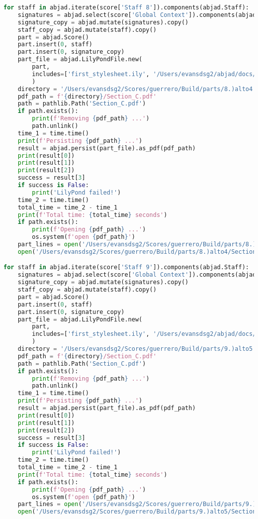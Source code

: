 \begin{lstlisting}[language=Python, caption=Invocation Source Code]
for staff in abjad.iterate(score['Staff 8']).components(abjad.Staff):
    signatures = abjad.select(score['Global Context']).components(abjad.Staff)
    signature_copy = abjad.mutate(signatures).copy()
    staff_copy = abjad.mutate(staff).copy()
    part = abjad.Score()
    part.insert(0, staff)
    part.insert(0, signature_copy)
    part_file = abjad.LilyPondFile.new(
        part,
        includes=['first_stylesheet.ily', '/Users/evansdsg2/abjad/docs/source/_stylesheets/abjad.ily'],
        )
    directory = '/Users/evansdsg2/Scores/guerrero/Build/parts/8.)alto4'
    pdf_path = f'{directory}/Section_C.pdf'
    path = pathlib.Path('Section_C.pdf')
    if path.exists():
        print(f'Removing {pdf_path} ...')
        path.unlink()
    time_1 = time.time()
    print(f'Persisting {pdf_path} ...')
    result = abjad.persist(part_file).as_pdf(pdf_path)
    print(result[0])
    print(result[1])
    print(result[2])
    success = result[3]
    if success is False:
        print('LilyPond failed!')
    time_2 = time.time()
    total_time = time_2 - time_1
    print(f'Total time: {total_time} seconds')
    if path.exists():
        print(f'Opening {pdf_path} ...')
        os.system(f'open {pdf_path}')
    part_lines = open('/Users/evansdsg2/Scores/guerrero/Build/parts/8.)alto4/Section_C.ly').readlines()
    open('/Users/evansdsg2/Scores/guerrero/Build/parts/8.)alto4/Section_C.ly', 'w').writelines(part_lines[15:-1])

for staff in abjad.iterate(score['Staff 9']).components(abjad.Staff):
    signatures = abjad.select(score['Global Context']).components(abjad.Staff)
    signature_copy = abjad.mutate(signatures).copy()
    staff_copy = abjad.mutate(staff).copy()
    part = abjad.Score()
    part.insert(0, staff)
    part.insert(0, signature_copy)
    part_file = abjad.LilyPondFile.new(
        part,
        includes=['first_stylesheet.ily', '/Users/evansdsg2/abjad/docs/source/_stylesheets/abjad.ily'],
        )
    directory = '/Users/evansdsg2/Scores/guerrero/Build/parts/9.)alto5'
    pdf_path = f'{directory}/Section_C.pdf'
    path = pathlib.Path('Section_C.pdf')
    if path.exists():
        print(f'Removing {pdf_path} ...')
        path.unlink()
    time_1 = time.time()
    print(f'Persisting {pdf_path} ...')
    result = abjad.persist(part_file).as_pdf(pdf_path)
    print(result[0])
    print(result[1])
    print(result[2])
    success = result[3]
    if success is False:
        print('LilyPond failed!')
    time_2 = time.time()
    total_time = time_2 - time_1
    print(f'Total time: {total_time} seconds')
    if path.exists():
        print(f'Opening {pdf_path} ...')
        os.system(f'open {pdf_path}')
    part_lines = open('/Users/evansdsg2/Scores/guerrero/Build/parts/9.)alto5/Section_C.ly').readlines()
    open('/Users/evansdsg2/Scores/guerrero/Build/parts/9.)alto5/Section_C.ly', 'w').writelines(part_lines[15:-1])


\end{lstlisting}
